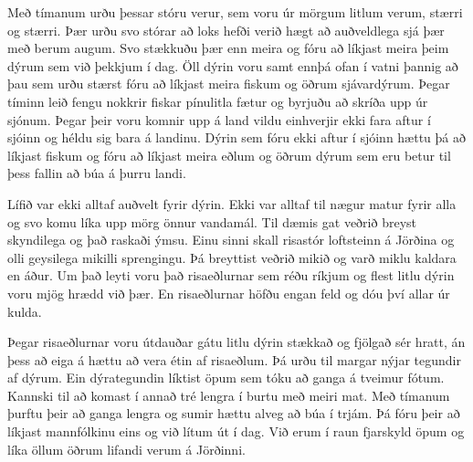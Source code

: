 \documentclass[ebook,11pt,oneside,openany]{memoir}
\begin{document}
Með tímanum urðu þessar stóru verur, sem voru úr mörgum litlum verum, stærri og stærri. Þær urðu svo stórar að loks hefði verið hægt að auðveldlega sjá þær með berum augum. Svo stækkuðu þær enn meira og fóru að líkjast meira þeim dýrum sem við þekkjum í dag. Öll dýrin voru samt ennþá ofan í vatni þannig að þau sem urðu stærst fóru að líkjast meira fiskum og öðrum sjávardýrum. Þegar tíminn leið fengu nokkrir fiskar pínulitla fætur og byrjuðu að skríða upp úr sjónum. Þegar þeir voru komnir upp á land vildu einhverjir ekki fara aftur í sjóinn og héldu sig bara á landinu. Dýrin sem fóru ekki aftur í sjóinn hættu þá að líkjast fiskum og fóru að líkjast meira eðlum og öðrum dýrum sem eru betur til þess fallin að búa á þurru landi.

\bigskip

Lífið var ekki alltaf auðvelt fyrir dýrin. Ekki var alltaf til nægur matur fyrir alla og svo komu líka upp mörg önnur vandamál. Til dæmis gat veðrið breyst skyndilega og það raskaði ýmsu. Einu sinni skall risastór loftsteinn á Jörðina og olli geysilega mikilli sprengingu. Þá breyttist veðrið mikið og varð miklu kaldara en áður. Um það leyti voru það risaeðlurnar sem réðu ríkjum og flest litlu dýrin voru mjög hrædd við þær. En risaeðlurnar höfðu engan feld og dóu því allar úr kulda.

Þegar risaeðlurnar voru útdauðar gátu litlu dýrin stækkað og fjölgað sér hratt,  án þess að eiga á hættu að vera étin af risaeðlum. Þá urðu til margar nýjar tegundir af dýrum. Ein dýrategundin líktist öpum sem tóku að ganga á tveimur fótum. Kannski til að komast í annað tré lengra í burtu með meiri mat. Með tímanum þurftu þeir að ganga lengra og sumir hættu alveg að búa í trjám. Þá fóru þeir að líkjast mannfólkinu eins og við lítum út í dag. Við erum í raun fjarskyld öpum og líka öllum öðrum lifandi verum á Jörðinni.
\end{document}
